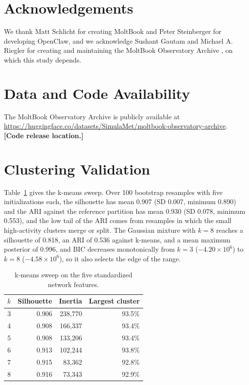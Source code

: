 \documentclass{article}
\newcommand{\tbd}[1]{\textbf{[#1]}}
\begin{document}
\section*{Acknowledgements}

We thank Matt Schlicht for creating MoltBook and Peter Steinberger for developing OpenClaw, and we acknowledge Sushant Gautam and Michael A. Riegler for creating and maintaining the MoltBook Observatory Archive \citep{moltbook_observatory_archive_2026}, on which this study depends.

\section*{Data and Code Availability}
The MoltBook Observatory Archive is publicly available at \url{https://huggingface.co/datasets/SimulaMet/moltbook-observatory-archive}. \tbd{Code release location.}




\appendix

\section{Clustering Validation}
\label{app:validation}

Table~\ref{tab:ksweep} gives the k-means sweep. Over 100 bootstrap resamples with five initializations each, the silhouette has mean 0.907 (SD 0.007, minimum 0.890) and the ARI against the reference partition has mean 0.930 (SD 0.078, minimum 0.553), and the low tail of the ARI comes from resamples in which the small high-activity clusters merge or split. The Gaussian mixture with $k=8$ reaches a silhouette of 0.818, an ARI of 0.536 against k-means, and a mean maximum posterior of 0.996, and BIC decreases monotonically from $k=3$ ($-4.20 \times 10^6$) to $k=8$ ($-4.58 \times 10^6$), so it also selects the edge of the range.

\begin{table}[H]
\centering
\caption{k-means sweep on the five standardized network features.}
\label{tab:ksweep}
\begin{tabular}{@{}rrrr@{}}
\toprule
\textbf{$k$} & \textbf{Silhouette} & \textbf{Inertia} & \textbf{Largest cluster} \\
\midrule
3 & 0.906 & 238,770 & 93.5\% \\
4 & 0.908 & 166,337 & 93.4\% \\
5 & 0.908 & 133,206 & 93.4\% \\
6 & 0.913 & 102,244 & 93.8\% \\
7 & 0.915 & 83,362 & 92.8\% \\
8 & 0.916 & 73,343 & 92.9\% \\
\bottomrule
\end{tabular}
\end{table}
\end{document}
